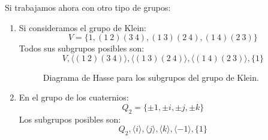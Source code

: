 \begin{ejemplo}
    Si trabajamos ahora con otro tipo de grupos:
    \begin{enumerate}
        \item Si consideramos el grupo de Klein:
            \begin{equation*}
                V = \{1, (1\ 2)(3\ 4), (1\ 3)(2\ 4), (1\ 4)(2\ 3)\}
            \end{equation*}
            Todos sus subgrupos posibles son:
            \begin{equation*}
                V, \langle (1\ 2)(3\ 4) \rangle , \langle (1\ 3)(2\ 4) \rangle , \langle (1\ 4)(2\ 3) \rangle , \{1\}
            \end{equation*}

            \begin{figure}[H]
                \centering
                \caption{Diagrama de Hasse para los subgrupos del grupo de Klein.}
            \end{figure}

        \item En el grupo de los cuaternios:
            \begin{equation*}
                Q_2 = \{\pm 1,\pm i, \pm j, \pm k\}
            \end{equation*}
            Los subgrupos posibles son:
            \begin{equation*}
                Q_2, \langle i \rangle , \langle j \rangle , \langle k \rangle , \langle -1 \rangle , \{1\}
            \end{equation*}


\end{enumerate}
\end{ejemplo}
